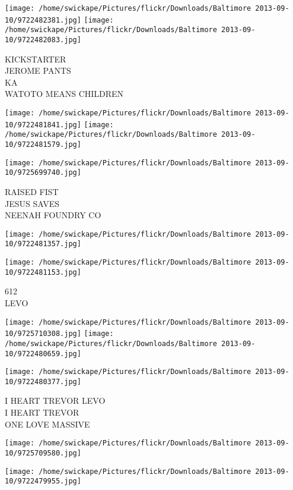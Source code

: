\documentclass[10pt,letterpaper]{article}
\begin{document}
\texttt{[image: /home/swickape/Pictures/flickr/Downloads/Baltimore 2013-09-10/9722482381.jpg]}
\texttt{[image: /home/swickape/Pictures/flickr/Downloads/Baltimore 2013-09-10/9722482083.jpg]}

KICKSTARTER\\
JEROME PANTS\\
KA\\
WATOTO MEANS CHILDREN\\
\pagebreak

\texttt{[image: /home/swickape/Pictures/flickr/Downloads/Baltimore 2013-09-10/9722481841.jpg]}
\texttt{[image: /home/swickape/Pictures/flickr/Downloads/Baltimore 2013-09-10/9722481579.jpg]}

\vspace{0.25in}
\texttt{[image: /home/swickape/Pictures/flickr/Downloads/Baltimore 2013-09-10/9725699740.jpg]}

RAISED FIST\\
JESUS SAVES\\
NEENAH FOUNDRY CO\\
\pagebreak

\texttt{[image: /home/swickape/Pictures/flickr/Downloads/Baltimore 2013-09-10/9722481357.jpg]}

\vspace{0.25in}
\texttt{[image: /home/swickape/Pictures/flickr/Downloads/Baltimore 2013-09-10/9722481153.jpg]}

612\\
LEVO\\
\pagebreak

\texttt{[image: /home/swickape/Pictures/flickr/Downloads/Baltimore 2013-09-10/9725710308.jpg]}
\texttt{[image: /home/swickape/Pictures/flickr/Downloads/Baltimore 2013-09-10/9722480659.jpg]}

\texttt{[image: /home/swickape/Pictures/flickr/Downloads/Baltimore 2013-09-10/9722480377.jpg]}

I HEART TREVOR LEVO\\
I HEART TREVOR\\
ONE LOVE MASSIVE\\
\pagebreak

\texttt{[image: /home/swickape/Pictures/flickr/Downloads/Baltimore 2013-09-10/9725709580.jpg]}

\vspace{0.25in}
\texttt{[image: /home/swickape/Pictures/flickr/Downloads/Baltimore 2013-09-10/9722479955.jpg]}
\end{document}
